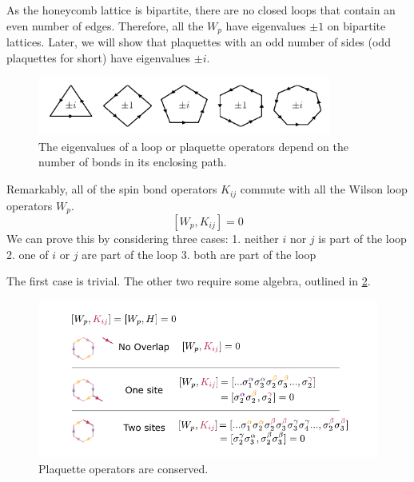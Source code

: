 As the honeycomb lattice is bipartite, there are no closed loops that contain an even number of edges. Therefore, all the \(W_p\) have eigenvalues \(\pm 1\) on bipartite lattices. Later, we will show that plaquettes with an odd number of sides (odd plaquettes for short) have eigenvalues \(\pm i\).

\begin{figure}
\hypertarget{fig:regular_plaquettes}{%
\centering
\includegraphics[width=0.86\textwidth,height=\textheight]{figure_code/amk_chapter/intro/regular_plaquettes/regular_plaquettes}
\caption[Plaquettes in the Kitaev Model]{The eigenvalues of a loop or plaquette operators depend on the
number of bonds in its enclosing path.}\label{fig:regular_plaquettes}
}
\end{figure}

Remarkably, all of the spin bond operators \(K_{ij}\) commute with all the Wilson loop operators \(W_p\). \[[W_p, K_{ij}] = 0\] We can prove this by considering three cases: 1. neither \(i\) nor \(j\) is part of the loop 2. one of \(i\) or \(j\) are part of the loop 3. both are part of the loop

The first case is trivial. The other two require some algebra, outlined in \cref{fig:visual_kitaev_2}.

\begin{figure}
\hypertarget{fig:visual_kitaev_2}{%
\centering
\includegraphics[width=1\textwidth,height=\textheight]{figure_code/amk_chapter/visual_kitaev_2}
\caption[Plaquette Operators are Conserved]{Plaquette operators are conserved.}\label{fig:visual_kitaev_2}
}
\end{figure}

